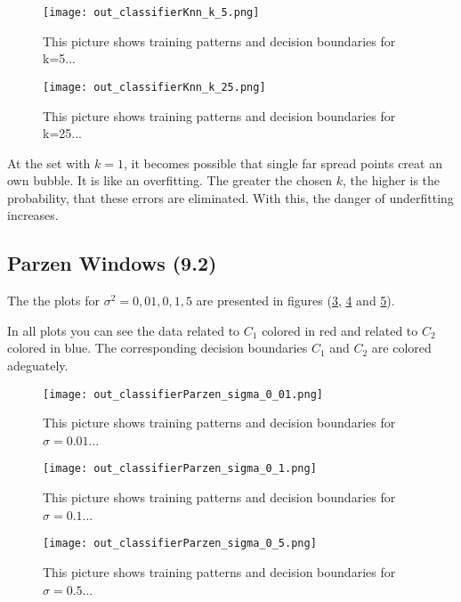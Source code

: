 \documentclass[a4paper,headings=small]{scrartcl}
\begin{document}
\begin{figure}[htbp]
\centering
\texttt{[image: out\_classifierKnn\_k\_5.png]}
\caption{This picture shows training patterns and decision boundaries for k=5...}
\label{fig:out_classifierKnn_k_5}
\end{figure}

\begin{figure}[htbp]
\centering
\texttt{[image: out\_classifierKnn\_k\_25.png]}
\caption{This picture shows training patterns and decision boundaries for k=25...}
\label{fig:out_classifierKnn_k_25}
\end{figure}

At the set with $k = 1$, it becomes possible that single far spread points creat an own bubble.
It is like an overfitting. The greater the chosen $k$, the higher is the probability, that these errors are eliminated.
With this, the danger of underfitting increases.


\subsection{Parzen Windows (9.2)}
The the plots for $\sigma^2 = 0,01, 0,1, 5$ are presented in figures (\ref{fig:out_classifierParzen_sigma_0.01},
\ref{fig:out_classifierParzen_sigma_0.1} and \ref{fig:out_classifierParzen_sigma_0.5}).

In all plots you can see the data related to $C_1$ colored in red and related to $C_2$ colored in blue.
The corresponding decision boundaries $C_1$ and $C_2$ are colored adeguately.

\begin{figure}[htbp]
\centering
\texttt{[image: out\_classifierParzen\_sigma\_0\_01.png]}
\caption{This picture shows training patterns and decision boundaries for $\sigma=0.01$...}
\label{fig:out_classifierParzen_sigma_0.01}
\end{figure}

\begin{figure}[htbp]
\centering
\texttt{[image: out\_classifierParzen\_sigma\_0\_1.png]}
\caption{This picture shows training patterns and decision boundaries for $\sigma=0.1$...}
\label{fig:out_classifierParzen_sigma_0.1}
\end{figure}

\begin{figure}[htbp]
\centering
\texttt{[image: out\_classifierParzen\_sigma\_0\_5.png]}
\caption{This picture shows training patterns and decision boundaries for $\sigma=0.5$...}
\label{fig:out_classifierParzen_sigma_0.5}
\end{figure}
\end{document}
